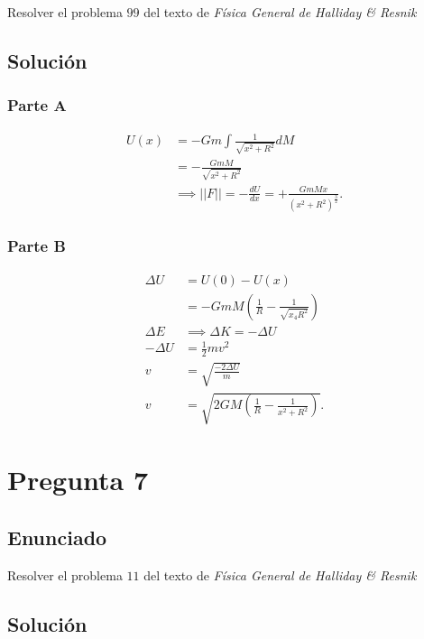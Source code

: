 \documentclass[12pt]{article}
\begin{document}
Resolver el problema $99$ del texto de \textit{Física General de Halliday \& Resnik}

\subsection*{Solución}

\subsubsection*{Parte A}

\begin{align*}
  U\left( x \right) &= -Gm \int \frac{1}{\sqrt{x^2+R^2} }dM\\
  &= - \frac{GmM}{\sqrt{x^2 + R^2} } \\
  &\implies ||F||= -\frac{dU}{dx}=+\frac{GmMx}{\left( x^2+R^2 \right)^{\frac{3}{2}}}
.\end{align*}

\subsubsection*{Parte B}

\begin{align*}
  \Delta U &= U\left( 0 \right) - U\left( x \right)  \\
  &= -GmM \left( \frac{1}{R}-\frac{1}{\sqrt{x_4R^2} } \right)  \\
  \Delta E &\implies \Delta K = - \Delta U \\
  -\Delta U &= \frac{1}{2}mv^2 \\
  v &= \sqrt{\frac{-2\Delta U}{m}}  \\
  v &= \sqrt{2GM\left( \frac{1}{R} - \frac{1}{x^2+R^2} \right) }
.\end{align*}


\section*{Pregunta 7}

\subsection*{Enunciado}

Resolver el problema $11$ del texto de \textit{Física General de Halliday \& Resnik}

\subsection*{Solución}
\end{document}
